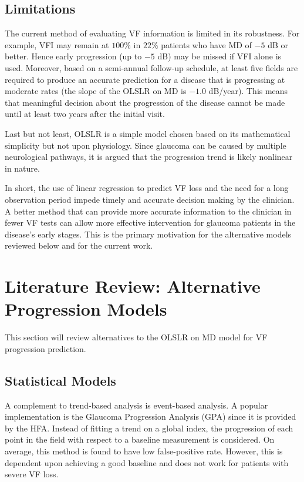 \subsection{Limitations}

The current method of evaluating \ac{VF} information is limited in its robustness. For example, \ac{VFI} may remain at $100\%$ in $22\%$ patients who have MD of $-5$ dB or better. Hence early progression (up to $-5$ dB) may be missed if VFI alone is used. Moreover, based on a semi-annual follow-up schedule, at least five fields are required to produce an accurate prediction for a disease that is progressing at moderate rates (the slope of the OLSLR on MD is $-1.0$ dB/year). \cite{Chauhan2008} This means that meaningful decision about the progression of the disease cannot be made until at least two years after the initial visit. 

Last but not least, \ac{OLSLR} is a simple model chosen based on its mathematical simplicity but not upon physiology. Since glaucoma can be caused by multiple neurological pathways, it is argued that the progression trend is likely nonlinear in nature. \cite{Pathak2013} 

In short, the use of linear regression to predict \ac{VF} loss and the need for a long observation period impede timely and accurate decision making by the clinician. A better method that can provide more accurate information to the clinician in fewer \ac{VF} tests can allow more effective intervention for glaucoma patients in the disease's early stages. This is the primary motivation for the alternative models reviewed below and for the current work.

\section{Literature Review: Alternative Progression Models}

This section will review alternatives to the \ac{OLSLR} on MD model for \ac{VF} progression prediction. 

\subsection{Statistical Models}

A complement to trend-based analysis is event-based analysis. A popular implementation is the Glaucoma Progression Analysis (GPA) since it is provided by the \ac{HFA}. Instead of fitting a trend on a global index, the progression of each point in the field with respect to a baseline measurement is considered. On average, this method is found to have low false-positive rate. However, this is dependent upon achieving a good baseline and does not work for patients with severe \ac{VF} loss. \cite{Aref2017}


